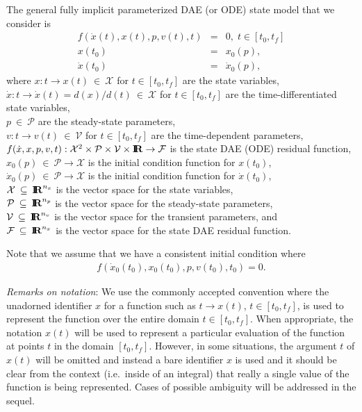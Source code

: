 \documentclass[pdf,ps2pdf,11pt]{SANDreport}
\begin{document}
The general fully implicit parameterized DAE (or ODE) state model that we
consider is
%
\begin{eqnarray}
f\left( \dot{x}(t), x(t), p, v(t), t \right) & = & 0,
\; t \in \left[ t_0, t_f \right] \label{eqn:sens:f} \\
x(t_0) & = & x_0(p), \label{eqn:sens:f:ic} \\
\dot{x}(t_0) & = & \dot{x}_0(p), \label{eqn:sens:f:ic-dot}
\end{eqnarray}
%
where
\bifthen
%
{}\> $x: t {}\rightarrow x(t){}\:\in\:\mathcal{X}$ for $t\in[t_0,t_f]$ are the
state variables, \\
%
{}\> $\dot{x}: t {}\rightarrow \dot{x}(t) = d(x)/d(t)\:\in\:\mathcal{X}$ for
$t\in[t_0,t_f]$ are the time-differentiated state variables,
\\
%
{}\> $p{}\:\in\:\mathcal{P}$ are the steady-state parameters,\\
%
{}\> $v: t {}\rightarrow v(t){}\:\in\:\mathcal{V}$ for $t\in[t_0,t_f]$ are the
time-dependent parameters, \\
%
{}\> $f(\dot{x}, x, p, v, t)
:{}\mathcal{X}^2{}\times{}\mathcal{P}{}\times{}\mathcal{V}{}\times{}\mbox{\textbf{I}}\hspace{-0.6ex}\mbox{\textbf{R}}
{}\rightarrow{}\mathcal{F}$ is the state DAE (ODE) residual function, \\
%
{}\> $x_0(p){}\:\in\:\mathcal{P}{}\rightarrow{}\mathcal{X}$ is the initial
condition function for $x(t_0)$, \\
%
{}\> $\dot{x}_0(p){}\:\in\:\mathcal{P}{}\rightarrow{}\mathcal{X}$ is the
initial condition function for $\dot{x}(t_0)$, \\
%
{}\> $\mathcal{X}{}\:\subseteq\:\mbox{\textbf{I}}\hspace{-0.6ex}\mbox{\textbf{R}}^{n_x}$ is the vector space for the state
variables, \\
%
{}\> $\mathcal{P}{}\:\subseteq\:\mbox{\textbf{I}}\hspace{-0.6ex}\mbox{\textbf{R}}^{n_p}$ is the vector space for the
steady-state parameters, \\
%
{}\> $\mathcal{V}{}\:\subseteq\:\mbox{\textbf{I}}\hspace{-0.6ex}\mbox{\textbf{R}}^{n_v}$ is the vector space for the
transient parameters, and \\
%
{}\> $\mathcal{F}{}\:\subseteq\:\mbox{\textbf{I}}\hspace{-0.6ex}\mbox{\textbf{R}}^{n_x}$ is the vector space for the state
DAE residual function.
\eifthen

Note that we assume that we have a consistent initial condition where
%
\begin{eqnarray}
f\left( \dot{x}_0(t_0), x_0(t_0), p, v(t_0), t_0 \right) = 0. \label{dae::consistent-ic}
\end{eqnarray}

{}\textit{Remarks on notation}: We use the commonly accepted convention where
the unadorned identifier $x$ for a function such as $t {}\rightarrow x(t)$,
$t\in[t_0,t_f]$, is used to represent the function over the entire domain
$t\in[t_0,t_f]$.  When appropriate, the notation $x(t)$ will be used to
represent a particular evaluation of the function at points $t$ in the domain
$[t_0,t_f]$.  However, in some situations, the argument $t$ of $x(t)$ will be
omitted and instead a bare identifier $x$ is used and it should be clear from
the context (i.e.\ inside of an integral) that really a single value of the
function is being represented.  Cases of possible ambiguity will be addressed
in the sequel.
\end{document}
